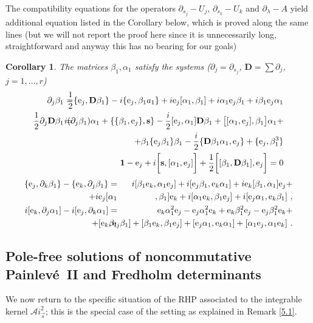 \documentclass{article}
\def\ss{\mathbf s}
\newtheorem{cor}{Corollary}[section]
\def \D{{\mathbf D}}
\def\b{\beta}
\def\&{&\hspace{-20pt}}
\def\1{\mathbf 1}
\def\a{{\alpha}}
\def \pa{\partial}
\newcommand{\be}{\begin{eqnarray}}
\newcommand{\ee}{\end{eqnarray}}
\begin{document}
The compatibility equations for the operators $\pa_{s_j} -U_j$, $\pa_{s_k} -U_k$ and $\pa_\lambda  - A$ yield additional equation listed in the Corollary below, which is proved along the same lines (but we will not report the proof here since it is unnecessarily long, straightforward and anyway this has no bearing for our goals)
\begin{cor}
The matrices $\b_1,  \a_1$ satisfy the systems ($\pa_j = \pa_{s_j}$, $\D = \sum \pa_j$, $j=1,\dots,r$)
\be
\pa_j \b_1 =&\&  \frac 1 2 \{{\mathrm e}_{j},\D \b_1\}- i \{{\mathrm e}_{j}, \b_1 a_1\} + i {\mathrm e}_{j}[ \a_1,\b_1] + i \a_1{\mathrm e}_{j}\b_1 + i \b_1{\mathrm e}_{j}\a_1\\
\frac 1 2 \pa_j\D \b_1= &\&  i (\pa_j \b_1) \a_1+
 \{\{\b_1, {\mathrm e}_{j}\} ,\ss\}   
 - \frac i 2 [{\mathrm e}_{j}, \a_1 ]\D \b_1 +\big[ [\a_1, {\mathrm e}_{j} ],\b_1\big] \a_1 +\nonumber \\
&\& + \b_1\{ {\mathrm e}_{j} \b_1\} \b_1   - \frac i 2 \{\D \b_1 \a_1, {\mathrm e}_{j}\}   + \{{\mathrm e}_{j} ,\b_1^3\}  \\
&\&
\1 - {\mathrm e}_{j} + i \bigg[\ss ,[\a_1, {\mathrm e}_{j}  ]\bigg]     +  \frac 1 2 \bigg[ [\b_1 ,\D \b_1], {\mathrm e}_{j} \bigg]  =0
 \ee
 \be
 \{{\mathrm e}_{j} , \pa_k\b_1\} - \{{\mathrm e}_{k} , \pa_j  \b_1\}   =&\&  i[ \b_1 {\mathrm e}_{k}, \a_1 {\mathrm e}_{j}]
 + i [{\mathrm e}_{j} \b_1, {\mathrm e}_{k} \a_1 ] 
 + i {\mathrm e}_{k} [\b_1 ,\a_1] {\mathrm e}_{j}  +\nonumber \\
+ i {\mathrm e}_{j} [\a_1&\& , \b_1] {\mathrm e}_{k}   
 + i [\a_1 {\mathrm e}_{k}, \b_1 {\mathrm e}_{j} ]  
 + i [{\mathrm e}_{j} \a_1 ,{\mathrm e}_{k} \b_1]\ , 
 \\
i[ {\mathrm e}_{k},\pa_j\a_1]  - i [{\mathrm e}_{j} ,\pa_k \a_1] 
=&\&  {\mathrm e}_{k} \a_1^2 {\mathrm e}_{j}-{\mathrm e}_{j} \a_1^2 {\mathrm e}_{k} +{\mathrm e}_{k} \b_1^2 {\mathrm e}_{j}-{\mathrm e}_{j}\b_1^2 {\mathrm e}_{k}
+\nonumber 
\\
+ [{\mathrm e}_{k} \b_1&\&, {\mathrm e}_{j} \b_1] 
+ [\b_1 {\mathrm e}_{k} ,\b_1 {\mathrm e}_{j}] 
+ [{\mathrm e}_{j} \a_1,  {\mathrm e}_{k} \a_1]
+ [\a_1 {\mathrm e}_{j} , \a_1 {\mathrm e}_{k}]\ .
\ee
\end{cor}


\subsection{Pole-free solutions of noncommutative Painlev\'e\ II and Fredholm determinants}
We now return to the specific situation of the RHP associated to the integrable kernel ${\mathcal Ai}_{\vec s}^2$; this is the special case of the setting as explained in Remark \ref{5.1}.
\end{document}
